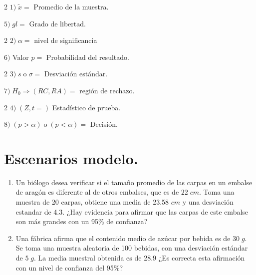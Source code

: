 \documentclass[a4paper,12pt]{article} %
\begin{document}
\vspace{\baselineskip}

\begin{multicols}{2}
    \(1) \; \tilde{x} =\) Promedio de la muestra. 

    \(5) \; gl = \) Grado de libertad.
\end{multicols}

\begin{multicols}{2}
    \(2)\; \alpha = \) nivel de significancia
    
    \(6)\) Valor \(p =\) Probabilidad del resultado.
\end{multicols}

\begin{multicols}{2}
    \(3)\; s \; \text{o} \; \sigma =\) Desviación estándar.

    \(7) \; H_0 \Rightarrow (RC,RA) =\) región de rechazo.
    
\end{multicols}

\begin{multicols}{2}
    \(4) \; (Z,t =)\) Estadístico de prueba.

    \(8) \; (p > \alpha)\; \text{o} \; (p < \alpha) =\) Decisión.
\end{multicols}

\vspace{\baselineskip}

\section{Escenarios modelo.}

\begin{enumerate}
    \item Un biólogo desea verificar si el tamaño promedio de las carpas en un embalse de aragón es diferente 
    al de otros embalses, que es de \(22 \; cm\). Toma una muestra de 20 carpas, obtiene una media de 23.58 \(cm\)
    y una desviación estandar de 4.3. ¿Hay evidencia para afirmar que las carpas de este embalse son más grandes con un 95\% de confianza?

    \item Una fábrica afirma que el contenido medio de azúcar por bebida es de \(30 \; g\). Se toma una muestra aleatoria de 100 bebidas,
    con una desviación estándar de \(5 \; g\). La media muestral obtenida es de 28.9 ¿Es correcta esta afirmación con un nivel de confianza del 95\%?
\end{enumerate}
\end{document}
